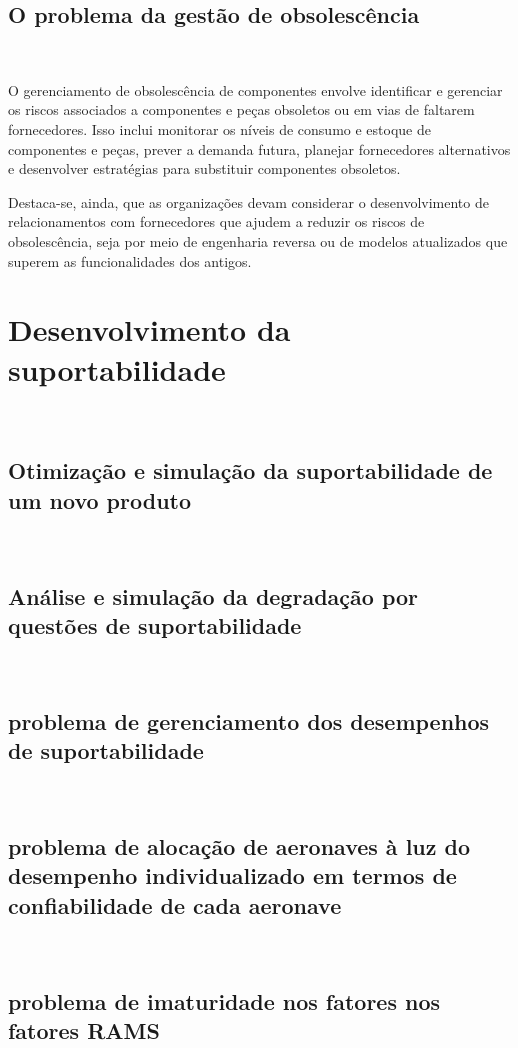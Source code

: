 \documentclass{abntex2}
\begin{document}
\begin{sloppypar}
\subsection{O problema da gestão de obsolescência}\

O gerenciamento de obsolescência de componentes envolve identificar e gerenciar os riscos associados a componentes e peças obsoletos ou em vias de faltarem fornecedores. Isso inclui monitorar os níveis de consumo e estoque de componentes e peças, prever a demanda futura, planejar fornecedores alternativos e desenvolver estratégias para substituir componentes obsoletos.

Destaca-se, ainda, que as organizações devam considerar o desenvolvimento de relacionamentos com fornecedores que ajudem a reduzir os riscos de obsolescência, seja por meio de engenharia reversa ou de modelos atualizados que superem as funcionalidades dos antigos.


\section{Desenvolvimento da suportabilidade}\


\subsection{Otimização e simulação da suportabilidade de um novo produto}\

\subsection{Análise e simulação da degradação por questões de suportabilidade}\

\subsection{problema de gerenciamento dos desempenhos de suportabilidade}\

\subsection{problema de alocação de aeronaves à luz do desempenho individualizado em termos de confiabilidade de cada aeronave}\

\subsection{problema de imaturidade nos fatores nos fatores RAMS}\


\end{sloppypar}
\end{document}
